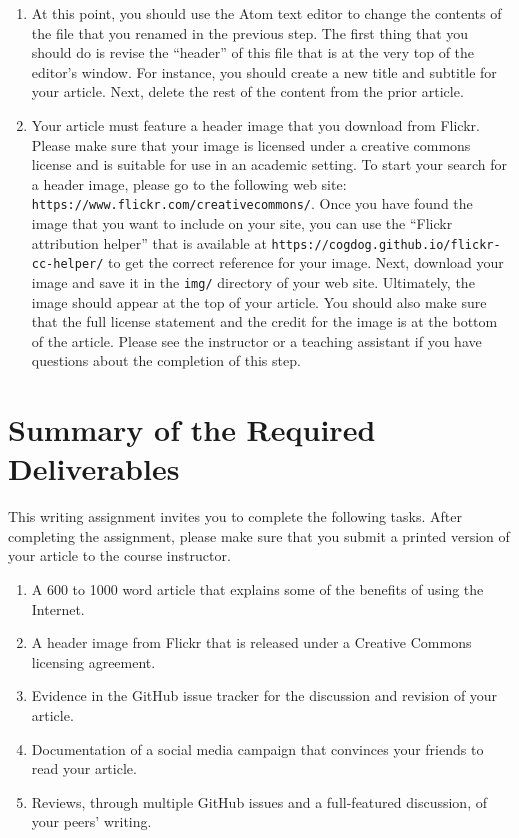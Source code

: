 \begin{enumerate}
  \item At this point, you should use the Atom text editor to change the contents of the file that you renamed in the
    previous step. The first thing that you should do is revise the ``header'' of this file that is at the very top of
    the editor's window. For instance, you should create a new title and subtitle for your article. Next, delete the
    rest of the content from the prior article.

  \item Your article must feature a header image that you download from Flickr. Please make sure that your image is
    licensed under a creative commons license and is suitable for use in an academic setting. To start your search for a
    header image, please go to the following web site: {\tt https://www.flickr.com/creativecommons/}. Once you have
    found the image that you want to include on your site, you can use the ``Flickr attribution helper'' that is
    available at {\tt https://cogdog.github.io/flickr-cc-helper/} to get the correct reference for your image. Next,
    download your image and save it in the {\tt img/} directory of your web site. Ultimately, the image should appear at
    the top of your article. You should also make sure that the full license statement and the credit for the image is
    at the bottom of the article. Please see the instructor or a teaching assistant if you have questions about the
    completion of this step.

\end{enumerate}

\vspace*{-.05in}
\section*{Summary of the Required Deliverables}

This writing assignment invites you to complete the following tasks. After completing the assignment, please make sure
that you submit a printed version of your article to the course instructor.

\vspace*{-.1in}
\begin{enumerate}
  \setlength{\itemsep}{0in}

  \item A 600 to 1000 word article that explains some of the benefits of using the Internet.
  \item A header image from Flickr that is released under a Creative Commons licensing agreement.
  \item Evidence in the GitHub issue tracker for the discussion and revision of your article.
  \item Documentation of a social media campaign that convinces your friends to read your article.
  \item Reviews, through multiple GitHub issues and a full-featured discussion, of your peers' writing.

\end{enumerate}
\vspace*{-.1in}

